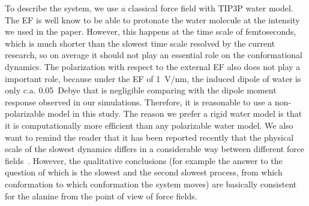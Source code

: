 \documentclass[a4paper,preprint,unsortedaddress,onecolumn]{revtex4-1}
\begin{document}
To describe the system, we use a classical force field with TIP3P water model.
The EF is well know to be able to protonate the water molecule at the
intensity we used in the paper. However, this happens at the time
scale of femtoseconds, which is much shorter than the slowest time
scale resolved by the current research, so on average it should not play an essential role on the conformational dynamics.
The polarization with respect to the external EF also does
not play a important role, because  under the EF of 1~V/nm, the induced dipole
of water is only c.a. 0.05~Debye that is negligible comparing with the
dipole moment response observed in our simulations.  Therefore, it is
reasonable to use a non-polarizable model in this study.  The reason we
prefer a rigid water model is that it is computationally more
efficient than any polarizable water model.  We also want to remind
the reader that it has been reported recently that the physical scale of the slowest
dynamics differs in a considerable way between different force
fields~\cite{vitalini2013speed}. However, the qualitative conclusions (for
example the answer to the question of which is the slowest and the second slowest process, from which
conformation to which conformation the system moves) are basically consistent for the alanine from the point of view of force fields.



{}

\end{document}
